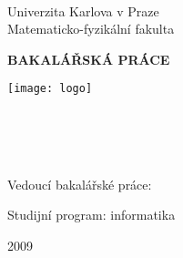 \begin{titlepage}
\begin{center}
\ \\

\vspace{15mm}

\large
Univerzita Karlova v Praze\\
Matematicko-fyzikální fakulta\\

\vspace{5mm}

{\Large\bf BAKALÁŘSKÁ PRÁCE}

\vspace{10mm}

\texttt{[image: logo]} 

\vspace{15mm}

{\Large \bcAuthor}\\ %
\vspace{5mm}
{\Large\bf \bcTitle}\\ %
\vspace{5mm}
\bcKSVI\\ %
\end{center}
\vspace{15mm}

\large
\noindent Vedoucí bakalářské práce: \bcTeacher %
\vspace{1mm} 

\noindent Studijní program: informatika %

\vspace{20mm}

\begin{center}
2009 %
\end{center}

\end{titlepage} %

